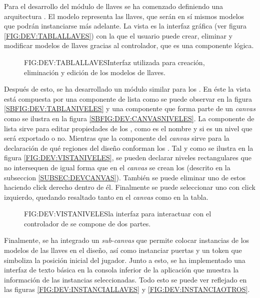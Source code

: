 Para el desarrollo del módulo de llaves se ha comenzado definiendo una arquitectura . El modelo representa las llaves, que serán en sí mismos modelos que podrán instanciarse más adelante. La vista es la interfaz gráfica (ver figura \ref{FIG:DEV:TABLALLAVES}) con la que el usuario puede crear, eliminar y modificar modelos de llaves gracias al controlador, que es una componente lógica.

\begin{figure}{FIG:DEV:TABLALLAVES}{Interfaz utilizada para creación, eliminación y edición de los modelos de llaves.}
\end{figure}

Después de esto, se ha desarrollado un módulo similar para los . En éste la vista está compuesta por una componente de lista como se puede observar en la figura \ref{SBFIG:DEV:TABLANIVELES} y una componente que forma parte de un \textit{canvas} como se ilustra en la figura \ref{SBFIG:DEV:CANVASNIVELES}.
La componente de lista sirve para editar propiedades de los , como es el nombre y si es un nivel que será exportado o no. Mientras que la componente del \textit{canvas} sirve para la declaración de qué regiones del diseño conforman los .
Tal y como se ilustra en la figura \ref{FIG:DEV:VISTANIVELES}, se pueden declarar niveles rectangulares que no intersequen de igual forma que en el \textit{canvas} se crean los  (descrito en la subseccion \ref{SUBSEC:DEVCANVAS}). También se puede eliminar uno de estos  haciendo click derecho dentro de él. Finalmente se puede seleccionar uno con click izquierdo, quedando resaltado tanto en el \textit{canvas} como en la tabla.

\begin{figure}{FIG:DEV:VISTANIVELES}{la interfaz para interactuar con el controlador de  se compone de dos partes.}
	 \quad
\end{figure}

Finalmente, se ha integrado un \textit{sub-canvas} que permite colocar instancias de los modelos de las llaves en el diseño, así como instanciar puertas y un token que simboliza la posición inicial del jugador. Junto a esto, se ha implementado una interfaz de texto básica en la consola inferior de la aplicación que muestra la información de las instancias seleccionadas.
Todo esto se puede ver reflejado en las figuras \ref{FIG:DEV:INSTANCIALLAVES} y \ref{FIG:DEV:INSTANCIAOTROS}.

